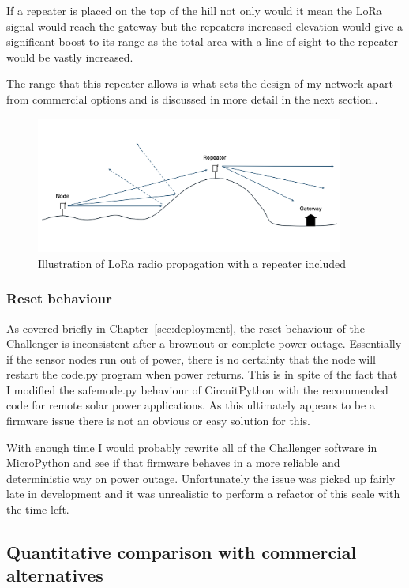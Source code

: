 If a repeater is placed on the top of the hill not only would it mean the LoRa
signal would reach the gateway but the repeaters increased elevation would give
a significant boost to its range as the total area with a line of sight to the
repeater would be vastly increased.

The range that this repeater allows is what sets the design of my network apart
from commercial options and is discussed in more detail in the next section..

\begin{figure}[H]
  \centering
  \includegraphics[width=0.9\textwidth]{contents/part-4/fig4/repeater.png}
  \caption{Illustration of LoRa radio propagation with a repeater included}
  \label{fig:repeater}
\end{figure}

\subsubsection{Reset behaviour}\label{sec:reset-behaviour}

As covered briefly in Chapter~\ref{sec:deployment}, the reset behaviour of the
Challenger is inconsistent after a brownout or complete power outage.
Essentially if the sensor nodes run out of power, there is no certainty that the
node will restart the code.py program when power returns. This is in spite of
the fact that I modified the safemode.py behaviour of CircuitPython with the
recommended code for remote solar power applications. As this ultimately appears
to be a firmware issue there is not an obvious or easy solution for this.

With enough time I would probably rewrite all of the Challenger software in
MicroPython and see if that firmware behaves in a more reliable and
deterministic way on power outage. Unfortunately the issue was picked up fairly
late in development and it was unrealistic to perform a refactor of this scale
with the time left.

\subsection{Quantitative comparison with commercial alternatives}


